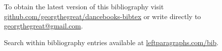 \documentclass[10pt,a4paper]{article}
\begin{document}
To obtain the latest version of this bibliography visit \href{http://github.com/georgthegreat/dancebooks-bibtex}{github.com/georgthegreat/dancebooks-bibtex} or write directly to \href{mailto://georgthegreat@gmail.com}{georgthegreat@gmail.com}.

Search within bibliography entries available at \href{http://leftparagraphs.com/bib/index.html}{leftparagraphs.com/bib}.

\nocite{*}
\printbibliography
\end{document}
